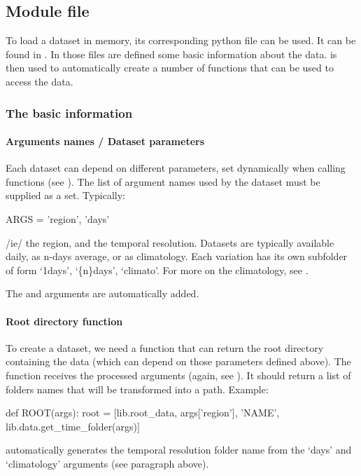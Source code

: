 \subsection{Module file}
To load a dataset in memory, its corresponding python file can be used. It can be found in .
In those files are defined some basic information about the data.
 is then used to automatically create a number of functions that can be used to access the data.
\subsubsection{The basic information}
\paragraph{Arguments names / Dataset parameters}
Each dataset can depend on different parameters, set dynamically when calling functions (see ).
The list of argument names used by the dataset must be supplied as a set.
Typically:
\begin{python}
ARGS = {'region', 'days'}
\end{python}
/ie/ the region, and the temporal resolution.
Datasets are typically available daily, as n-days average, or as climatology.
Each variation has its own subfolder of form `1days', `\{n\}days', `climato'.
For more on the climatology, see .

The  and  arguments are automatically added.

\paragraph{Root directory function}
To create a dataset, we need a function that can return the root directory containing the data (which can depend on those parameters defined above).
The function receives the processed arguments (again, see ).
It should return a list of folders names that will be transformed into a path. Example:
\begin{python}
def ROOT(args):
    root = [lib.root_data, args['region'], 'NAME', lib.data.get_time_folder(args)]
\end{python}
 automatically generates the temporal resolution folder name from the `days' and `climatology' arguments (see paragraph above).

